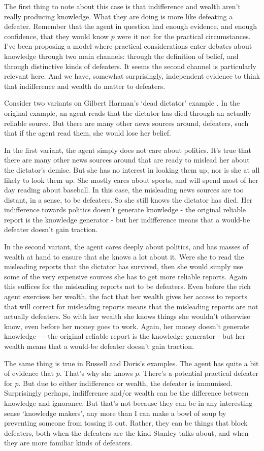 The first thing to note about this case is that indifference and wealth aren't really producing knowledge. What they are doing is more like defeating a defeater. Remember that the agent in question had enough evidence, and enough confidence, that they would know \(p\) were it not for the practical circumstances. I've been proposing a model where practical considerations enter debates about knowledge through two main channels: through the definition of belief, and through distinctive kinds of defeaters. It seems the second channel is particularly relevant here. And we have, somewhat surprisingly, independent evidence to think that indifference and wealth do matter to defeaters.

Consider two variants on Gilbert Harman's `dead dictator' example \citep[75]{Harman1973}. In the original example, an agent reads that the dictator has died through an actually reliable source. But there are many other news sources around, defeaters, such that if the agent read them, she would lose her belief. 

In the first variant, the agent simply does not care about politics. It's true that there are many other news sources around that are ready to mislead her about the dictator's demise. But she has no interest in looking them up, nor is she at all likely to look them up. She mostly cares about sports, and will spend most of her day reading about baseball. In this case, the misleading news sources are too distant, in a sense, to be defeaters. So she still knows the dictator has died. Her indifference towards politics doesn't generate knowledge - the original reliable report is the knowledge generator - but her indifference means that a would-be defeater doesn't gain traction.

In the second variant, the agent cares deeply about politics, and has masses of wealth at hand to ensure that she knows a lot about it. Were she to read the misleading reports that the dictator has survived, then she would simply use some of the very expensive sources she has to get more reliable reports. Again this suffices for the misleading reports not to be defeaters. Even before the rich agent exercises her wealth, the fact that her wealth gives her access to reports that will correct for misleading reports means that the misleading reports are not actually defeaters. So with her wealth she knows things she wouldn't otherwise know, even before her money goes to work. Again, her money doesn't generate knowledge - - the original reliable report is the knowledge generator - but her wealth means that a would-be defeater doesn't gain traction.

The same thing is true in Russell and Doris's examples. The agent has quite a bit of evidence that \(p\). That's why she knows \(p\). There's a potential practical defeater for \(p\). But due to either indifference or wealth, the defeater is immunised. Surprisingly perhaps, indifference and/or wealth can be the difference between knowledge and ignorance. But that's not because they can be in any interesting sense `knowledge makers', any more than I can make a bowl of soup by preventing someone from tossing it out. Rather, they can be things that block defeaters, both when the defeaters are the kind Stanley talks about, and when they are more familiar kinds of defeaters.